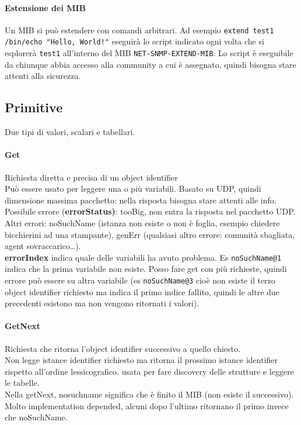 \documentclass[10pt]{book}
\begin{document}
\paragraph{Estensione dei MIB} Un MIB si può estendere con comandi arbitrari. Ad esempio \texttt{extend test1 /bin/echo "Hello, World!"} eseguirà lo script indicato ogni volta che si esplorerà \texttt{test1} all'interno del MIB \texttt{NET-SNMP-EXTEND-MIB}. Lo script è eseguibile da chiunque abbia accesso alla community a cui è assegnato, quindi bisogna stare attenti alla sicurezza.
\subsection{Primitive}
Due tipi di valori, scalari e tabellari.
\paragraph{Get} Richiesta diretta e precisa di un object identifier\\
Può essere usato per leggere una o più variabili. Basato su UDP, quindi dimensione massima pacchetto: nella risposta bisogna stare attenti alle info. Possibile errore (\textbf{errorStatus)}: tooBig, non entra la risposta nel pacchetto UDP. Altri errori: noSuchName (istanza non esiste o non è foglia, esempio chiedere bicchierini ad una stampante), genErr (qualsiasi altro errore: comunità sbagliata, agent sovraccarico\ldots).\\
\textbf{errorIndex} indica quale delle variabili ha avuto problema. Es \texttt{noSuchName@1} indica che la prima variabile non esiste. Posso fare get con più richieste, quindi errore può essere su altra variabile (es \texttt{noSuchName@3} cioè non esiste il terzo object identifier richiesto ma indica il primo indice fallito, quindi le altre due precedenti esistono ma non vengono ritornati i valori).
\paragraph{GetNext} Richiesta che ritorna l'object identifier successivo a quello chiesto.\\
Non legge istance identifier richiesto ma ritorna il prossimo istance identifier rispetto all'ordine lessicografico. usata per fare discovery delle strutture e leggere le tabelle.\\Nella getNext, nosuchname significa che è finito il MIB (non esiste il successivo). Molto implementation depended, alcuni dopo l'ultimo ritornano il primo invece che noSuchName.
\end{document}
